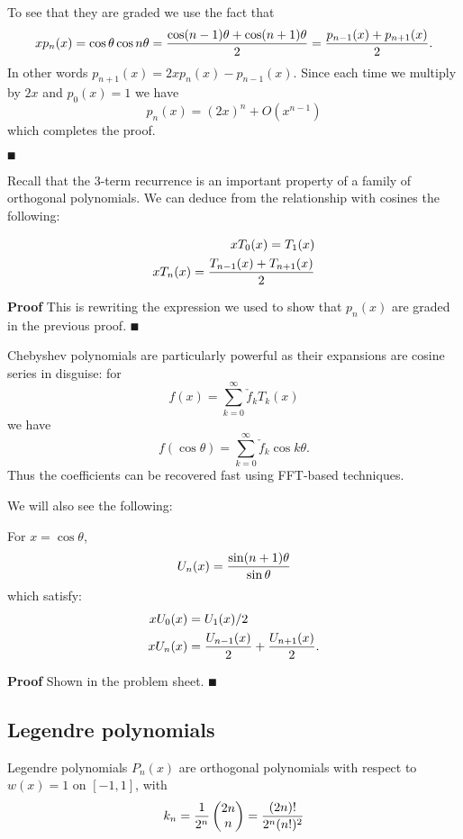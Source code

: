 To see that they are graded we use the fact that
\[
x p_n(x) = \cos \ensuremath{\theta} \cos n \ensuremath{\theta} = {\cos(n-1)\ensuremath{\theta} + \cos(n+1)\ensuremath{\theta} \over 2} = {p_{n-1}(x) + p_{n+1}(x) \over 2}.
\]
In other words $p_{n+1}(x) = 2x p_n(x) - p_{n-1}(x)$. Since each time we multiply by $2x$ and $p_0(x) = 1$ we have
\[
p_n(x) = (2x)^n + O(x^{n-1})
\]
which completes the proof.

\ensuremath{\QED}

Recall that the 3-term recurrence is an important property of a family of orthogonal polynomials. We can deduce from the relationship with cosines the following:

\begin{corollary}
\begin{align*}
x T_0(x) = T_1(x) \\
x T_n(x) = {T_{n-1}(x) + T_{n+1}(x) \over 2}
\end{align*}
\end{corollary}
\textbf{Proof} This is rewriting the expression we used to show that $p_n(x)$ are graded in the previous proof. \ensuremath{\QED}

Chebyshev polynomials are particularly powerful as their expansions are cosine series in disguise: for
\[
f(x) = \ensuremath{\sum}_{k=0}^\ensuremath{\infty} \check f_k T_k(x)
\]
we have
\[
f(\cos \ensuremath{\theta}) = \ensuremath{\sum}_{k=0}^\ensuremath{\infty} \check f_k \cos k \ensuremath{\theta}.
\]
Thus the coefficients can be recovered fast using FFT-based techniques.

We will also see the following:

\begin{theorem} For $x = \cos \ensuremath{\theta}$,
\[
U_n(x) = {\sin(n+1) \ensuremath{\theta} \over \sin \ensuremath{\theta}}
\]
which satisfy:
\begin{align*}
x U_0(x) &= U_1(x)/2 \\
x U_n(x) &= {U_{n-1}(x) \over 2} + {U_{n+1}(x) \over 2}.
\end{align*}
\end{theorem}
\textbf{Proof} Shown in the problem sheet. \ensuremath{\QED}

\subsection{Legendre polynomials}
\begin{definition}[Legendre] Legendre polynomials $P_n(x)$ are orthogonal polynomials with respect to $w(x) = 1$ on $[-1,1]$, with
\[
k_n = {1 \over 2^n} \begin{pmatrix} 2n \\ n \end{pmatrix} =
{(2n)! \over 2^n (n!)^2}
\]
\end{definition}

